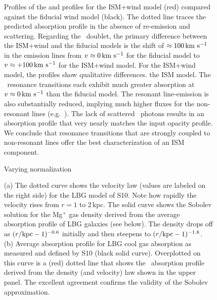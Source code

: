 \documentclass[12pt,preprint]{aastex}
\begin{document}
\begin{figure}
\caption{
Profiles of the  and  profiles for the ISM+wind
model (red) compared against the fiducial wind model (black). 
The dotted line traces the predicted absorption profile in the absence
of re-emission and scattering.
Regarding the ~doublet, the primary difference between the
ISM+wind and the fiducial models is the shift of $\approx 100 \, {\rm km~s^{-1}}$
in the emission lines from $v \approx 0 \, {\rm km~s^{-1}}$ for the fiducial
model to $v \approx +100\, {\rm km~s^{-1}}$ for the ISM+wind model. 
For the ISM+wind model, 
the  profiles show qualitative differences. 
the ISM model.  The \feiid\ resonance transitions each exhibit much
greater absorption at $v \approx 0 \, {\rm km~s^{-1}}$ than the fiducial model.
The resonant line-emission is also substantially
reduced, implying much higher fluxes for the non-resonant lines (e.g.\
\feiic).  The lack of scattered \feiia\ photons results in an
absorption profile that very nearly matches the input opacity profile.
We conclude that resonance transitions that are strongly coupled to
non-resonant lines offer the best
characterization of an ISM component.
}
\label{fig:ISM_spec}
\end{figure}

\begin{figure}
\caption{
Varying normalization
}
\label{fig:norm}
\end{figure}

\begin{figure}
\caption{
(a) The dotted curve shows the velocity law (values are labeled on the
right side) for the LBG model
of S10.  Note how rapidly the velocity rises from $r =
1$ to 2\,kpc.  The solid curve shows the Sobolev solution for the
Mg$^+$ gas
density derived from 
the average absorption profile of LBG galaxies (see below).
The density drops off as $(r/{\rm kpc}-1)^{-0.6}$ initially and then
steepens to $(r/{\rm kpc}-1)^{-1.8}$.
(b) Average absorption profile for LBG cool gas absorption as
measured and defined by S10
(black solid curve).  Overplotted on this curve is a (red) dotted line that
shows the \mgiia\ absorption profile derived from the density (and velocity)
law shown in the upper panel.  The excellent agreement confirms the
validity of the Sobolev approximation.
}
\label{fig:LBG_Sobolev}
\end{figure}

\clearpage
\end{document}
